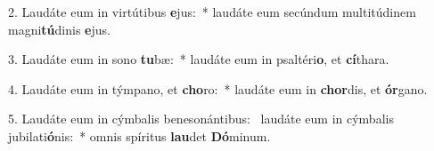 2. Laudáte eum in virtútibus \textbf{e}jus:~*  laudáte eum secúndum multitúdinem magni\textbf{tú}dinis \textbf{e}jus.\

3. Laudáte eum in sono \textbf{tu}bæ:~*  laudáte eum in psaltéri\textbf{o}, et \textbf{cí}thara.\

4. Laudáte eum in týmpano, et \textbf{cho}ro:~*  laudáte eum in \textbf{chor}dis, et \textbf{ór}gano.\

5. Laudáte eum in cýmbalis benesonántibus: \dag\  laudáte eum in cýmbalis jubilati\textbf{ó}nis:~*  omnis spíritus \textbf{lau}det \textbf{Dó}minum.\

